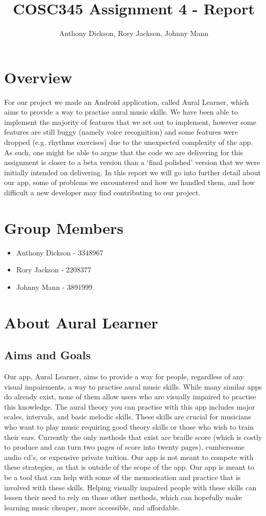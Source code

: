 \documentclass[10pt,a4paper]{article}
\author{Anthony Dickson, Rory Jackson, Johnny Mann}
\title{COSC345 Assignment 4 - Report}
\begin{document}
	
\maketitle
\tableofcontents

\section{Overview}
For our project we made an Android application, called Aural Learner, which aims to provide a way to practise aural music skills. We have been able to implement the majority of features that we set out to implement, however some features are still buggy (namely voice recognition) and some features were dropped (e.g. rhythms exercises) due to the unexpected complexity of the app. As such, one might be able to argue that the code we are delivering for this assignment is closer to a beta version than a ‘final polished’ version that we were initially intended on delivering. In this report we will go into further detail about our app, some of problems we encountered and how we handled them, and how difficult a new developer may find contributing to our project.

\section{Group Members}
\begin{itemize}
	\item Anthony Dickson - 3348967
	\item Rory Jackson - 2208377
	\item Johnny Mann - 3891999
\end{itemize}

\section{About Aural Learner}
\subsection{Aims and Goals}
Our app, Aural Learner, aims to provide a way for people, regardless of any visual impairments, a way to practise aural music skills. While many similar apps do already exist, none of them allow users who are visually impaired to practise this knowledge. The aural theory you can practise with this app includes major scales, intervals, and basic melodic skills. These skills are crucial for musicians who want to play music requiring good theory skills or those who wish to train their ears. Currently the only methods that exist are braille score (which is costly to produce and can turn two pages of score into twenty pages), cumbersome audio cd’s, or expensive private tuition. Our app is not meant to compete with these strategies, as that is outside of the scope of the app. Our app is meant to be a tool that can help with some of the memorisation and practice that is involved with these skills. Helping visually impaired people with these skills can lessen their need to rely on those other methods, which can hopefully make learning music cheaper, more accessible, and affordable.
\end{document}
